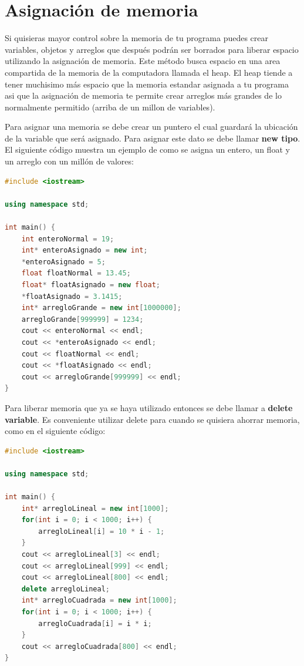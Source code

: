 \documentclass{article}
\begin{document}
\section{Asignación de memoria}

Si quisieras mayor control sobre la memoria de tu programa puedes crear variables, objetos y arreglos que después podrán ser borrados para liberar espacio utilizando la asignación de memoria. Este método busca espacio en una area compartida de la memoria de la computadora llamada el heap. El heap tiende a tener muchisimo más espacio que la memoria estandar asignada a tu programa asi que la asignación de memoria te permite crear arreglos más grandes de lo normalmente permitido (arriba de un millon de variables).

Para asignar una memoria se debe crear un puntero el cual guardará la ubicación de la variable que será asignado. Para asignar este dato se debe llamar \textbf{new tipo}. El siguiente código muestra un ejemplo de como se asigna un entero, un float y un arreglo con un millón de valores:

\begin{lstlisting}[language=C++, title=Asignando variables]
#include <iostream>

using namespace std;

int main() {
	int enteroNormal = 19;
	int* enteroAsignado = new int;
	*enteroAsignado = 5;
	float floatNormal = 13.45;
	float* floatAsignado = new float;
	*floatAsignado = 3.1415;
	int* arregloGrande = new int[1000000];
	arregloGrande[999999] = 1234;
	cout << enteroNormal << endl;
	cout << *enteroAsignado << endl;
	cout << floatNormal << endl;
	cout << *floatAsignado << endl;
	cout << arregloGrande[999999] << endl;
}    
\end{lstlisting}

Para liberar memoria que ya se haya utilizado entonces se debe llamar a \textbf{delete variable}. Es conveniente utilizar delete para cuando se quisiera ahorrar memoria, como en el siguiente código:

\begin{lstlisting}[language=C++, title=Borrando datos]
#include <iostream>

using namespace std;

int main() {
	int* arregloLineal = new int[1000];
	for(int i = 0; i < 1000; i++) {
		arregloLineal[i] = 10 * i - 1;
	}
	cout << arregloLineal[3] << endl;
	cout << arregloLineal[999] << endl;
	cout << arregloLineal[800] << endl;
	delete arregloLineal;
	int* arregloCuadrada = new int[1000];
	for(int i = 0; i < 1000; i++) {
		arregloCuadrada[i] = i * i;
	}
	cout << arregloCuadrada[800] << endl;
}     
\end{lstlisting}
\end{document}
